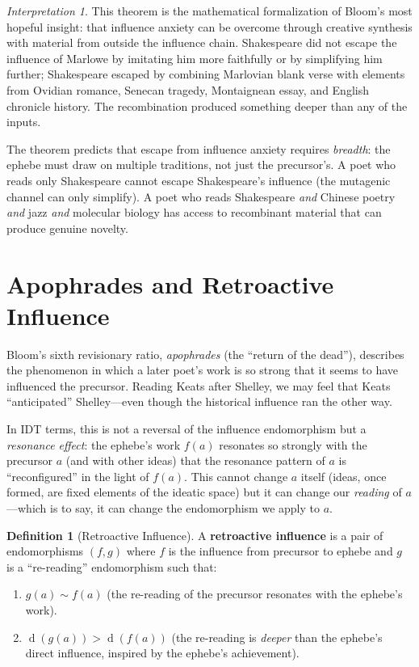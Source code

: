 \documentclass[11pt,openany]{book}
\theoremstyle{definition}
\newtheorem{definition}[axiom]{Definition}
\theoremstyle{plain}
\theoremstyle{remark}
\newtheorem{interpretation}[axiom]{Interpretation}
\newcommand{\res}{\sim}                      %
\newcommand{\depth}{\operatorname{d}}       %
\begin{document}
\begin{interpretation}
This theorem is the mathematical formalization of Bloom's most hopeful insight: that influence anxiety can be overcome through creative synthesis with material from outside the influence chain. Shakespeare did not escape the influence of Marlowe by imitating him more faithfully or by simplifying him further; Shakespeare escaped by combining Marlovian blank verse with elements from Ovidian romance, Senecan tragedy, Montaignean essay, and English chronicle history. The recombination produced something deeper than any of the inputs.

The theorem predicts that escape from influence anxiety requires \emph{breadth}: the ephebe must draw on multiple traditions, not just the precursor's. A poet who reads only Shakespeare cannot escape Shakespeare's influence (the mutagenic channel can only simplify). A poet who reads Shakespeare \emph{and} Chinese poetry \emph{and} jazz \emph{and} molecular biology has access to recombinant material that can produce genuine novelty.
\end{interpretation}

\section{Apophrades and Retroactive Influence}
\label{sec:apophrades}

Bloom's sixth revisionary ratio, \emph{apophrades} (the ``return of the dead''), describes the phenomenon in which a later poet's work is so strong that it seems to have influenced the precursor. Reading Keats after Shelley, we may feel that Keats ``anticipated'' Shelley---even though the historical influence ran the other way.

In IDT terms, this is not a reversal of the influence endomorphism but a \emph{resonance effect}: the ephebe's work $f(a)$ resonates so strongly with the precursor $a$ (and with other ideas) that the resonance pattern of $a$ is ``reconfigured'' in the light of $f(a)$. This cannot change $a$ itself (ideas, once formed, are fixed elements of the ideatic space) but it can change our \emph{reading} of $a$---which is to say, it can change the endomorphism we apply to $a$.

\begin{definition}[Retroactive Influence]
A \textbf{retroactive influence} is a pair of endomorphisms $(f, g)$ where $f$ is the influence from precursor to ephebe and $g$ is a ``re-reading'' endomorphism such that:
\begin{enumerate}
\item $g(a) \res f(a)$ (the re-reading of the precursor resonates with the ephebe's work).
\item $\depth(g(a)) > \depth(f(a))$ (the re-reading is \emph{deeper} than the ephebe's direct influence, inspired by the ephebe's achievement).
\end{enumerate}
\end{definition}
\end{document}
